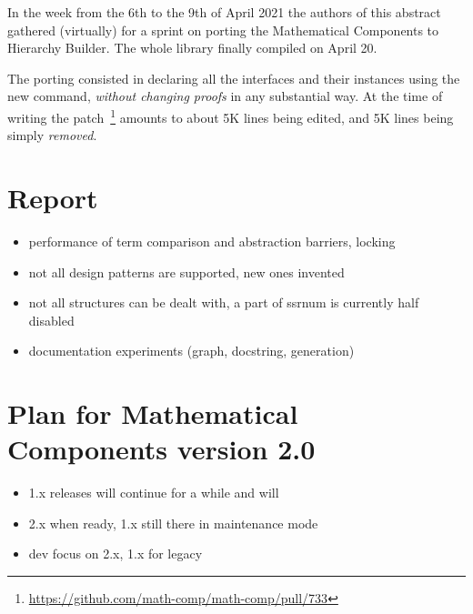 \documentclass{easychair}
\begin{document}
In the week from the 6th to the 9th of April 2021 the authors of this abstract
gathered (virtually) for a sprint on porting the Mathematical Components to
Hierarchy Builder. The whole library finally compiled on April 20.

The porting consisted in declaring all the interfaces and their instances
using the new command, \emph{without changing proofs} in any substantial way.
At the time of writing the patch~\footnote{\url{https://github.com/math-comp/math-comp/pull/733}}
amounts to about 5K lines being edited, and 5K lines being simply \emph{removed}.

\section{Report}

\begin{itemize}
\item performance of term comparison and abstraction barriers, locking
\item not all design patterns are supported, new ones invented
\item not all structures can be dealt with, a part of ssrnum is currently half disabled
\item documentation experiments (graph, docstring, generation)
\end{itemize}

\section{Plan for Mathematical Components version 2.0}

\begin{itemize}
\item 1.x releases will continue for a while and will
\item 2.x when ready, 1.x still there in maintenance mode
\item dev focus on 2.x, 1.x for legacy
\end{itemize}

\label{sect:bib}

%
%
%


\end{document}
